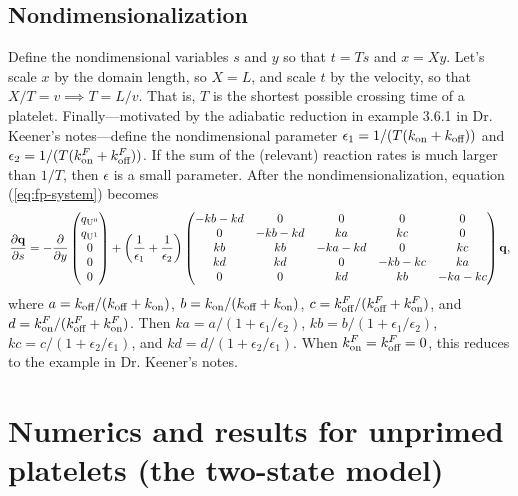 \documentclass{article}
\newcommand{\tn}{\textnormal}
\newcommand{\Pder}[2]{\frac{\partial #1}{\partial #2}}
\begin{document}
\subsection{Nondimensionalization}
\label{sec:nondim}

Define the nondimensional variables $s$ and $y$ so that $t = Ts$ and
$x = Xy$. Let's scale $x$ by the domain length, so $X = L$, and scale
$t$ by the velocity, so that $X/T = v \implies T = L/v$. That is, $T$
is the shortest possible crossing time of a
platelet. Finally---motivated by the adiabatic reduction in example
3.6.1 in Dr. Keener's notes---define the nondimensional parameter
$\epsilon_1 = 1/(T(k_\tn{on} + k_\tn{off}))$ and
$\epsilon_2 = 1/(T(k_\tn{on}^F + k_\tn{off}^F))$. If the sum of the
(relevant) reaction rates is much larger than $1/T$, then $\epsilon$
is a small parameter. After the nondimensionalization, equation
(\ref{eq:fp-system}) becomes
\begin{equation}
  \label{eq:nd-system}
  \Pder{\mathbf{q}}{s} = -\Pder{}{y}
  \begin{pmatrix}
    q_{\tn{U}^0} \\ q_{\tn{U}^1} \\ 0 \\ 0 \\ 0
  \end{pmatrix}
  + \left(\frac{1}{\epsilon_1} + \frac{1}{\epsilon_2}\right)
  \begin{pmatrix}
    - kb - kd & 0 & 0 & 0 & 0 \\
    0 & - kb - kd & ka & kc & 0 \\
    kb & kb & - ka - kd & 0 & kc \\
    kd & kd & 0 & - kb - kc & ka \\
    0 & 0 & kd & kb & - ka - kc
  \end{pmatrix}
  \mathbf{q},
\end{equation}
where $a = k_\tn{off}/(k_\tn{off} + k_\tn{on})$,
$b = k_\tn{on}/(k_\tn{off} + k_\tn{on})$,
$c = k_\tn{off}^F/(k_\tn{off}^F + k_\tn{on}^F)$, and
$d = k_\tn{on}^F/(k_\tn{off}^F + k_\tn{on}^F)$. Then
$ka = a/(1 + \epsilon_1/\epsilon_2)$,
$kb = b/(1 + \epsilon_1/\epsilon_2)$,
$kc = c/(1 + \epsilon_2/\epsilon_1)$, and
$kd = d/(1 + \epsilon_2/\epsilon_1)$. When
$k_\tn{on}^F = k_\tn{off}^F = 0$, this reduces to the example in
Dr. Keener's notes.

\section{Numerics and results for unprimed platelets (the two-state model)}
\label{sec:res-unpr}
\end{document}
